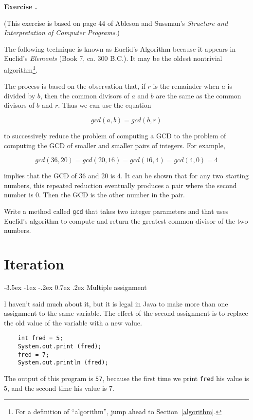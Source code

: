 \documentclass{book}
\makeatletter
\newcounter{exercisenum}
\renewcommand{\theexercisenum}{{\thechapter}.\arabic{exercisenum}}
\newenvironment{exercisesize}{\begin{small}}{\end{small}}
\newcommand{\exerciseheader}[2]{                                          
     
  \begin{exercisesize}                                                    
     
     
  \def\theenumi{\alph{enumi}}                                             
  \def\labelenumi{\theenumi.}                                             
  \def\theenumii{\roman{enumii}}                                          
  \def\labelenumii{\theenumii.}                                           
  {\bf Exercise {#1}{#2}}\hspace{0.1in}                 
}
\newcommand{\startexercise}[1]{%
  \refstepcounter{exercisenum}                                            
  \exerciseheader{\theexercisenum}{#1}                                    
}
\newcommand{\stopexercise}{%
  {\hfill}                                                               
  \end{exercisesize}      
}
\newcommand{\normaldif}{}
\newenvironment{exercise}{\startexercise{\normaldif{}}}{\stopexercise}
\renewcommand{\section}{\@startsection 
    {section} {1} {0mm}%
    {-3.5ex \@plus -1ex \@minus -.2ex}%
    {0.7ex \@plus.2ex}%
    {\normalfont\Large\bfseries}}
\newcommand{\clearemptydoublepage}{\newpage{\pagestyle{empty}\cleardoublepage}}
\newcommand{\beforechapter}{
    \cleardoublepage 
    \setcounter{exercisenum}{0}
}
\makeatother
\begin{document}
\begin{exercise}
\label{gcd}
(This exercise is based on page 44 of Ableson and Sussman's
{\em Structure and Interpretation of Computer Programs}.)

The following technique is known as Euclid's Algorithm because
it appears in Euclid's {\em Elements} (Book 7, ca. 300 B.C.).
It may be the oldest nontrivial algorithm\footnote{For a definition
of ``algorithm'', jump ahead to Section~\ref{algorithm}.}.

The process is based on the observation that, if $r$ is the
remainder when $a$ is divided by $b$, then the common divisors
of $a$ and $b$ are the same as the common divisors of $b$ and $r$.
Thus we can use the equation

\[ gcd (a, b) = gcd (b, r) \]

to successively reduce the problem of computing a GCD to the
problem of computing the GCD of smaller and smaller pairs of integers.
For example,

\[ gcd (36, 20) = gcd (20, 16) = gcd (16, 4) = gcd (4, 0) = 4\]

implies that the GCD of 36 and 20 is 4.  It can be shown
that for any two starting numbers, this repeated reduction eventually
produces a pair where the second number is 0.  Then the GCD is the
other number in the pair.

Write a method called {\tt gcd} that takes two integer parameters and
that uses Euclid's algorithm to compute and return the greatest
common divisor of the two numbers.
\end{exercise}


\beforechapter
\chapter{Iteration}
\label{chap06}

\section{Multiple assignment}

I haven't said much about it, but it is legal in Java to
make more than one assignment to the same variable.  The
effect of the second assignment is to replace the old value
of the variable with a new value.

\begin{verbatim}
    int fred = 5;
    System.out.print (fred);
    fred = 7;
    System.out.println (fred);
\end{verbatim}
%
The output of this program is {\tt 57}, because the first
time we print {\tt fred} his value is 5, and the second time
his value is 7.
\end{document}
